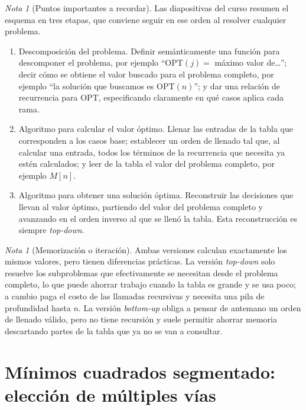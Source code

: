\documentclass[12pt, spanish, oneside, openany]{book}
\theoremstyle{uprightplain}
\theoremstyle{definition}
\theoremstyle{remark}
\newtheorem{nota}[teorema]{Nota}
\theoremstyle{definition}
\newcommand{\OPT}{\mathrm{OPT}} %
\begin{document}
\begin{nota}[Puntos importantes a recordar]
\label{nota:dp-receta}
Las diapositivas del curso resumen el esquema en tres etapas, que conviene seguir en ese orden al resolver cualquier problema.
\begin{enumerate}[label=(\arabic*)]
    \item Descomposición del problema. Definir semánticamente una función para descomponer el problema, por ejemplo ``$\OPT(j)=$ máximo valor de\dots''; decir cómo se obtiene el valor buscado para el problema completo, por ejemplo ``la solución que buscamos es $\OPT(n)$''; y dar una relación de recurrencia para $\OPT$, especificando claramente en qué casos aplica cada rama.
    \item Algoritmo para calcular el valor óptimo. Llenar las entradas de la tabla que corresponden a los casos base; establecer un orden de llenado tal que, al calcular una entrada, todos los términos de la recurrencia que necesita ya estén calculados; y leer de la tabla el valor del problema completo, por ejemplo $M[n]$.
    \item Algoritmo para obtener una solución óptima. Reconstruir las decisiones que llevan al valor óptimo, partiendo del valor del problema completo y avanzando en el orden inverso al que se llenó la tabla. Esta reconstrucción es siempre \emph{top-down}.
\end{enumerate}
\end{nota}

\begin{nota}[Memorización o iteración]
\label{nota:dp-topdown-bottomup}
Ambas versiones calculan exactamente los mismos valores, pero tienen diferencias prácticas. La versión \emph{top-down} solo resuelve los subproblemas que efectivamente se necesitan desde el problema completo, lo que puede ahorrar trabajo cuando la tabla es grande y se usa poco; a cambio paga el costo de las llamadas recursivas y necesita una pila de profundidad hasta $n$. La versión \emph{bottom-up} obliga a pensar de antemano un orden de llenado válido, pero no tiene recursión y suele permitir ahorrar memoria descartando partes de la tabla que ya no se van a consultar.
\end{nota}


\section{Mínimos cuadrados segmentado: elección de múltiples vías}
\label{sec:dp-minimos-cuadrados}
\end{document}
